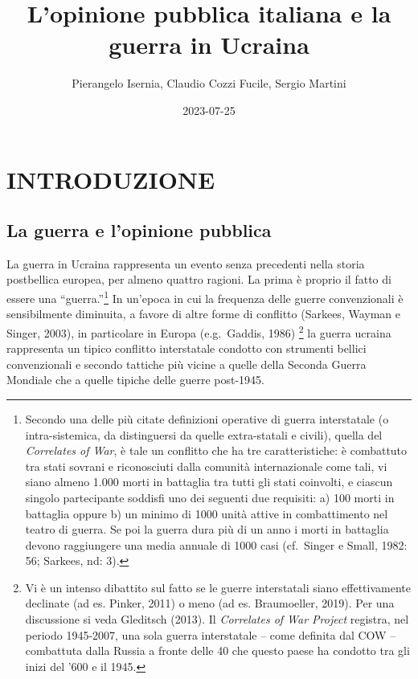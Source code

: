 \documentclass[
]{book}
\title{L'opinione pubblica italiana e la guerra in Ucraina}
\author{Pierangelo Isernia, Claudio Cozzi Fucile, Sergio Martini}
\date{2023-07-25}
\begin{document}
\maketitle

{
\setcounter{tocdepth}{1}
\tableofcontents
}
\hypertarget{introduzione}{%
\chapter{INTRODUZIONE}\label{introduzione}}

\hypertarget{la-guerra-e-lopinione-pubblica}{%
\section{La guerra e l'opinione pubblica}\label{la-guerra-e-lopinione-pubblica}}

La guerra in Ucraina rappresenta un evento senza precedenti nella storia postbellica europea, per almeno quattro ragioni. La prima è proprio il fatto di essere una ``guerra.''\footnote{Secondo una delle più citate definizioni operative di guerra interstatale (o intra-sistemica, da distinguersi da quelle extra-statali e civili), quella del \emph{Correlates of War}, è tale un conflitto che ha tre caratteristiche: è combattuto tra stati sovrani e riconosciuti dalla comunità internazionale come tali, vi siano almeno 1.000 morti in battaglia tra tutti gli stati coinvolti, e ciascun singolo partecipante soddisfi uno dei seguenti due requisiti: a) 100 morti in battaglia oppure b) un minimo di 1000 unità attive in combattimento nel teatro di guerra. Se poi la guerra dura più di un anno i morti in battaglia devono raggiungere una media annuale di 1000 casi (cf.~Singer e Small, 1982: 56; Sarkees, nd: 3).} In un'epoca in cui la frequenza delle guerre convenzionali è sensibilmente diminuita, a favore di altre forme di conflitto (Sarkees, Wayman e Singer, 2003), in particolare in Europa (e.g.~Gaddis, 1986) \footnote{Vi è un intenso dibattito sul fatto se le guerre interstatali siano effettivamente declinate (ad es. Pinker, 2011) o meno (ad es. Braumoeller, 2019). Per una discussione si veda Gleditsch (2013). Il \emph{Correlates of War Project} registra, nel periodo 1945-2007, una sola guerra interstatale -- come definita dal COW -- combattuta dalla Russia a fronte delle 40 che questo paese ha condotto tra gli inizi del '600 e il 1945.} la guerra ucraina rappresenta un tipico conflitto interstatale condotto con strumenti bellici convenzionali e secondo tattiche più vicine a quelle della Seconda Guerra Mondiale che a quelle tipiche delle guerre post-1945.
\end{document}
